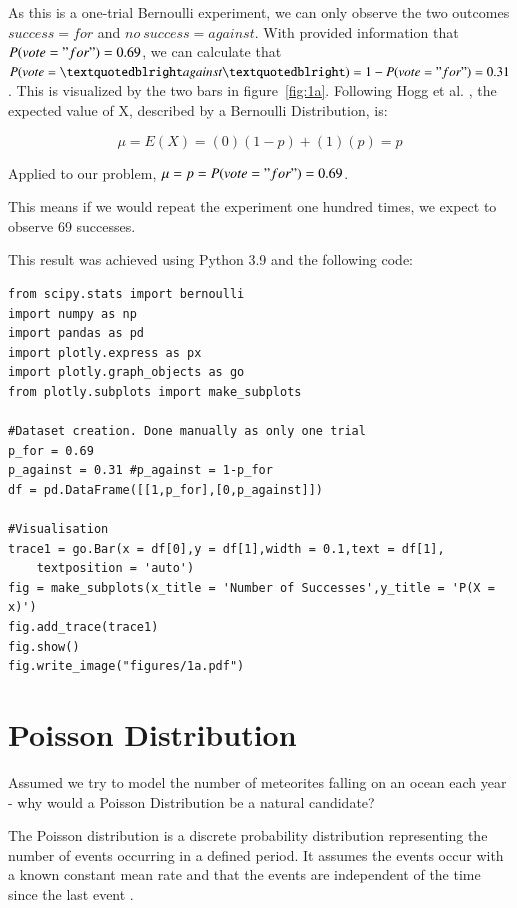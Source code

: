 As this is a one-trial Bernoulli experiment, we can only observe the two outcomes $success = for$ and $no~success = against$. With provided information that $P(vote = "for") = 0.69$, we can calculate that $P(vote=”against”) = 1 - P(vote = "for") = 0.31$. This is visualized by the two bars in figure~\eqref{fig:1a}. Following Hogg et al. \cite[Chapter~3.1]{hogg}, the expected value of X, described by a Bernoulli Distribution, is: 

\begin{equation}  \mu = E(X) = (0)(1-p) + (1)(p) = p
\label{eq:expvaluebernoulli}\end{equation}

Applied to our problem,  $ \mu = p = P(vote = "for") = 0.69 $.

This means if we would repeat the experiment one hundred times, we expect to observe 69 successes. 


This result was achieved using Python 3.9 and the following code:

\begin{verbatim}
from scipy.stats import bernoulli
import numpy as np
import pandas as pd
import plotly.express as px
import plotly.graph_objects as go
from plotly.subplots import make_subplots

#Dataset creation. Done manually as only one trial
p_for = 0.69
p_against = 0.31 #p_against = 1-p_for
df = pd.DataFrame([[1,p_for],[0,p_against]])

#Visualisation
trace1 = go.Bar(x = df[0],y = df[1],width = 0.1,text = df[1], 
    textposition = 'auto')
fig = make_subplots(x_title = 'Number of Successes',y_title = 'P(X = x)')
fig.add_trace(trace1)
fig.show()
fig.write_image("figures/1a.pdf")
\end{verbatim}

\section{Poisson Distribution}

Assumed we try to model the number of meteorites falling on an ocean each year - why would a Poisson Distribution be a natural candidate?


The Poisson distribution is a discrete probability distribution representing the number of events occurring in a defined period. It assumes the events occur with a known constant mean rate and that the events are independent of the time since the last event \cite[Chapter~4.6]{illowsky2018introductory}.


